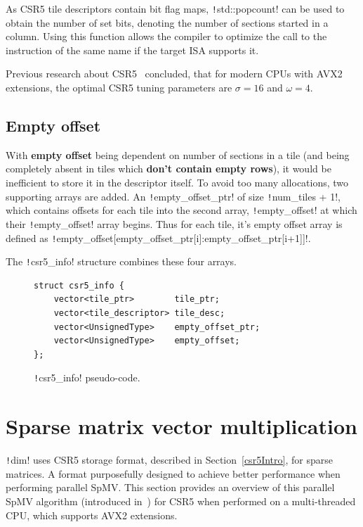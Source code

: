 \documentclass[thesis=M,english]{FITthesis}[2019/12/23]
\newcommand{\csre}[1]{\texttt!#1!}
\begin{document}
As CSR5 tile descriptors contain bit flag maps, \csre{std::popcount} can be used to obtain the number of set bits,
denoting the number of sections started in a column.
Using this function allows the compiler to optimize the call to the instruction of the same name 
if the target ISA supports it.

Previous research about CSR5~\cite{liu2015csr5} concluded, that for modern CPUs with AVX2 extensions, the optimal CSR5 tuning parameters
are \(\sigma = 16\) and \(\omega = 4\).


\subsection{Empty offset}

With \textbf{empty offset} being dependent on number of sections in a tile (and being completely absent
in tiles which \textbf{don't contain empty rows}), it would be inefficient to
store it in the descriptor itself. To avoid too many allocations, two supporting arrays are added.
An \csre{empty_offset_ptr} of size \csre{num_tiles + 1}, which contains offsets for each tile into the
second array, \csre{empty_offset} at which their \csre{empty_offset} array begins.
Thus for each tile, it's empty offset array is defined as
\csre{empty_offset[empty_offset_ptr[i]:empty_offset_ptr[i+1]]}.

The \csre{csr5_info} structure combines these four arrays.


\begin{figure}[htp]
    \begin{verbatim}
struct csr5_info {
    vector<tile_ptr>        tile_ptr;
    vector<tile_descriptor> tile_desc;
    vector<UnsignedType>    empty_offset_ptr;
    vector<UnsignedType>    empty_offset;
};
    \end{verbatim}
    \caption{\csre{csr5_info} pseudo-code.}
\end{figure}

\vfil
\pagebreak

\section{Sparse matrix vector multiplication}\label{csr5:spmv}


\csre{dim} uses CSR5 storage format, described in Section~\ref{csr5Intro}, for sparse matrices. A format purposefully
designed to achieve better performance when performing parallel SpMV\@. This section provides an overview
of this parallel SpMV algorithm (introduced in~\cite{liu2015csr5}) for CSR5 when performed on a multi-threaded
CPU, which supports AVX2 extensions.
\end{document}
